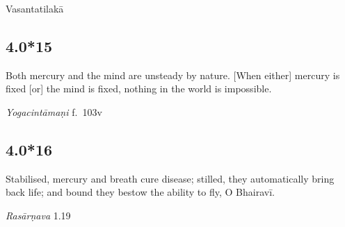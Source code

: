 \begin{ekdosis}

\begin{metre}[hp04_000_14]
Vasantatilakā 
\end{metre}

\subsection*{4.0*15}
\begin{translation}[hp04_000_15]
Both mercury and the mind are unsteady by nature. [When either] mercury is fixed [or] the mind is fixed, nothing in the world is impossible.
\end{translation}


\begin{testimonia}[hp04_000_15]
\emph{Yogacintāmaṇi} f.~103v
\begin{versinnote}
\end{versinnote}
\end{testimonia}


\subsection*{4.0*16}
\begin{translation}[hp04_000_16]
Stabilised, mercury and breath cure disease; stilled, they automatically bring back life; and bound they bestow the ability to fly, O Bhairavī.
\end{translation}

\begin{sources}[hp04_000_16]
\emph{Rasārṇava} 1.19
\begin{versinnote}
\end{versinnote}


\end{sources}
\end{ekdosis}
